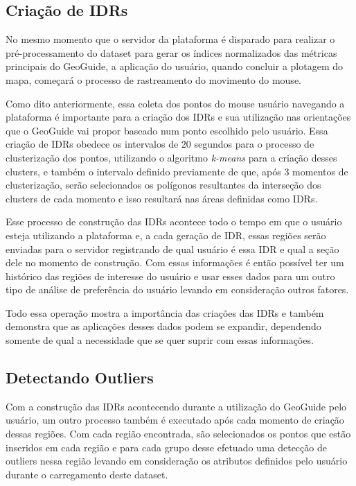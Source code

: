 \subsection{Criação de IDRs}

No mesmo momento que o servidor da plataforma é disparado para realizar o pré-processamento do dataset para gerar os índices normalizados das métricas principais do GeoGuide, a aplicação do usuário, quando concluir a plotagem do mapa, começará o processo de rastreamento do movimento do mouse.

Como dito anteriormente, essa coleta dos pontos do mouse usuário navegando a plataforma é importante para a criação dos IDRs e sua utilização nas orientações que o GeoGuide vai propor baseado num ponto escolhido pelo usuário. Essa criação de IDRs obedece os intervalos de $20$ segundos para o processo de clusterização dos pontos, utilizando o algoritmo \textit{k-means} para a criação desses clusters, e também o intervalo definido previamente de que, após $3$ momentos de clusterização, serão selecionados os polígonos resultantes da interseção dos clusters de cada momento e isso resultará nas áreas definidas como IDRs.

Esse processo de construção das IDRs acontece todo o tempo em que o usuário esteja utilizando a plataforma e, a cada geração de IDR, essas regiões serão enviadas para o servidor registrando de qual usuário é essa IDR e qual a seção dele no momento de construção. Com essas informações é então possível ter um histórico das regiões de interesse do usuário e usar esses dados para um outro tipo de análise de preferência do usuário levando em consideração outros fatores.

Todo essa operação mostra a importância das criações das IDRs e também demonstra que as aplicações desses dados podem se expandir, dependendo somente de qual a necessidade que se quer suprir com essas informações.

\subsection{Detectando Outliers}

Com a construção das IDRs acontecendo durante a utilização do GeoGuide pelo usuário, um outro processo também é executado após cada momento de criação dessas regiões. Com cada região encontrada, são selecionados os pontos que estão inseridos em cada região e para cada grupo desse efetuado uma detecção de outliers nessa região levando em consideração os atributos definidos pelo usuário durante o carregamento deste dataset.

